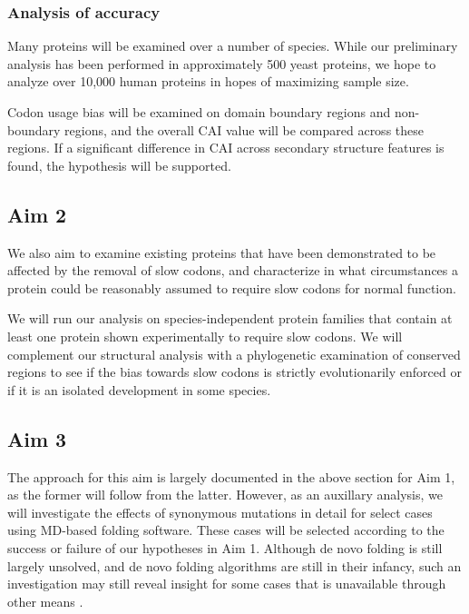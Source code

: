 \documentclass[11pt]{nih}
\newcommand{\todo}[1]{
\addcontentsline{tdo}{todo}{\protect{#1}}
\textcolor{red}{TODO: #1}
}
\begin{document}





\subsubsection{Analysis of accuracy}
Many proteins will be examined over a number of species. While our preliminary analysis has been performed in approximately 500 yeast proteins, we hope to analyze over 10,000 human proteins in hopes of maximizing sample size.

Codon usage bias will be examined on domain boundary regions and non-boundary regions, and the overall CAI value will be compared across these regions. If a significant difference in CAI across secondary structure features is found, the hypothesis will be supported.
\cite{Liu:2011p8245}


\subsection{Aim 2}
We also aim to examine existing proteins that have been demonstrated to be affected by the removal of slow codons, and characterize in what circumstances a protein could be reasonably assumed to require slow codons for normal function.

We will run our analysis on species-independent protein families that contain at least one protein shown experimentally to require slow codons. We will complement our structural analysis with a phylogenetic examination of conserved regions to see if the bias towards slow codons is strictly evolutionarily enforced or if it is an isolated development in some species.

\subsection{Aim 3}

The approach for this aim is largely documented in the above section for Aim 1, as the former will follow from the latter. However, as an auxillary analysis, we will investigate the effects of synonymous mutations in detail for select cases using MD-based folding software. These cases will be selected according to the success or failure of our hypotheses in Aim 1. Although de novo folding is still largely unsolved, and de novo folding algorithms are still in their infancy, such an investigation may still reveal insight for some cases that is unavailable through other means \cite{Zhang:2008p3335}.




 

\appendix
\end{document}
